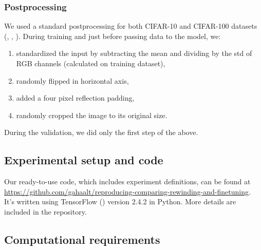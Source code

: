 \subsubsection{Postprocessing}
We used a standard postprocessing for both CIFAR-10 and CIFAR-100 datasets (\cite{Renda}, \cite{Frankle}, \cite{wrn}). During training and just before passing data to the model, we:
\begin{enumerate}
    \item standardized the input by subtracting the mean and dividing by the std of RGB channels (calculated on training dataset),
    \item randomly flipped in horizontal axis,
    \item added a four pixel reflection padding,
    \item randomly cropped the image to its original size.
\end{enumerate}

During the validation, we did only the first step of the above.



\subsection{Experimental setup and code}


Our ready-to-use code, which includes experiment definitions, can be found at 
\url{https://github.com/gahaalt/reproducing-comparing-rewinding-and-finetuning}.
It's written using TensorFlow (\cite{tensorflow}) version 2.4.2 in Python. More details are included in the repository.

\subsection{Computational requirements}

